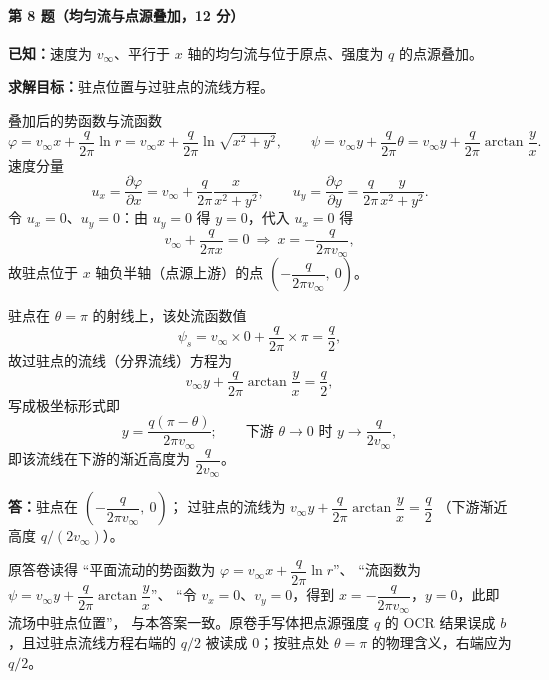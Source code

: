 \paragraph{第 8 题（均匀流与点源叠加，12 分）}
\begin{jie}
\textbf{已知：}速度为 $v_\infty$、平行于 $x$ 轴的均匀流与位于原点、强度为 $q$ 的点源叠加。

\textbf{求解目标：}驻点位置与过驻点的流线方程。

叠加后的势函数与流函数
\[
\varphi=v_\infty x+\frac{q}{2\pi}\ln r
=v_\infty x+\frac{q}{2\pi}\ln\sqrt{x^{2}+y^{2}},
\qquad
\psi=v_\infty y+\frac{q}{2\pi}\theta
=v_\infty y+\frac{q}{2\pi}\arctan\frac{y}{x}.
\]
速度分量
\[
u_x=\frac{\partial\varphi}{\partial x}=v_\infty+\frac{q}{2\pi}\frac{x}{x^{2}+y^{2}},
\qquad
u_y=\frac{\partial\varphi}{\partial y}=\frac{q}{2\pi}\frac{y}{x^{2}+y^{2}}.
\]
令 $u_x=0$、$u_y=0$：由 $u_y=0$ 得 $y=0$，代入 $u_x=0$ 得
\[
v_\infty+\frac{q}{2\pi x}=0
\ \Longrightarrow\
x=-\frac{q}{2\pi v_\infty},
\]
故驻点位于 $x$ 轴负半轴（点源上游）的点
$\left(-\dfrac{q}{2\pi v_\infty},\ 0\right)$。

驻点在 $\theta=\pi$ 的射线上，该处流函数值
\[
\psi_s=v_\infty\times0+\frac{q}{2\pi}\times\pi=\frac{q}{2},
\]
故过驻点的流线（分界流线）方程为
\[
v_\infty y+\frac{q}{2\pi}\arctan\frac{y}{x}=\frac{q}{2},
\]
写成极坐标形式即
\[
y=\frac{q(\pi-\theta)}{2\pi v_\infty};\qquad
\text{下游 } \theta\to0 \text{ 时 } y\to\frac{q}{2v_\infty},
\]
即该流线在下游的渐近高度为 $\dfrac{q}{2v_\infty}$。

\textbf{答：}驻点在 $\left(-\dfrac{q}{2\pi v_\infty},\ 0\right)$；
过驻点的流线为 $v_\infty y+\dfrac{q}{2\pi}\arctan\dfrac{y}{x}=\dfrac{q}{2}$
（下游渐近高度 $q/(2v_\infty)$）。
\end{jie}

\begin{tishi}
原答卷读得 ``平面流动的势函数为 $\varphi=v_\infty x+\dfrac{q}{2\pi}\ln r$''、
``流函数为 $\psi=v_\infty y+\dfrac{q}{2\pi}\arctan\dfrac{y}{x}$''、
``令 $v_x=0$、$v_y=0$，得到 $x=-\dfrac{q}{2\pi v_\infty}$，$y=0$，此即流场中驻点位置''，
与本答案一致。原卷手写体把点源强度 $q$ 的 OCR 结果误成 $b$，且过驻点流线方程右端的
$q/2$ 被读成 $0$；按驻点处 $\theta=\pi$ 的物理含义，右端应为 $q/2$。
\end{tishi}

